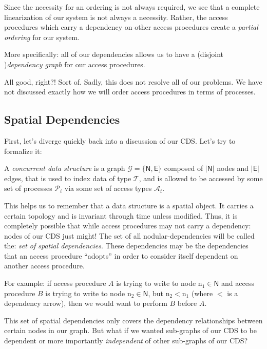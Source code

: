Since the necessity for an ordering is not always required, we see that a complete linearization of our system is not always a necessity. Rather, the access procedures which carry a dependency on other access procedures create a \textit{partial ordering} for our system.

More specifically: all of our dependencies allows us to have a (disjoint )\textit{dependency graph} for our access procedures.

All good, right?! Sort of. Sadly, this does not resolve all of our problems. We have not discussed exactly how we will order access procedures in terms of processes.

\subsection{Spatial Dependencies}

First, let's diverge quickly back into a discussion of our CDS. Let's try to formalize it:

\begin{con-def}
	\label{cds-graph}
	A \textit{concurrent data structure} is a graph $\mathcal{G} = \{\mathsf{N}, \mathsf{E}\}$ composed of $|\mathsf{N}|$ nodes and $|\mathsf{E}|$ edges, that is used to index data of type $\mathcal{T}$, and is allowed to be accessed by some set of processes $\mathcal{P}_{i}$ via some set of access types $\mathcal{A}_{t}$.
\end{con-def}

This helps us to remember that a data structure is a spatial object. It carries a certain topology and is invariant through time unless modified. Thus, it is completely possible that while access procedures may not carry a dependency: nodes of our CDS just might! The set of all nodular-dependencies will be called the: \textit{set of spatial dependencies}. These dependencies may be the dependencies that an access procedure ``adopts'' in order to consider itself dependent on another access procedure.

For example: if access procedure $\mathit{A}$ is trying to write to node $\mathrm{n}_{1} \in \mathsf{N}$ and access procedure $\mathit{B}$ is trying to write to node $\mathrm{n}_{2} \in \mathsf{N}$, but $\mathrm{n}_{2} < \mathrm{n}_{1}$ (where $<$ is a dependency arrow), then we would want to perform $\mathit{B}$ before $\mathit{A}$.

This set of spatial dependencies only covers the dependency relationships between certain nodes in our graph. But what if we wanted sub-graphs of our CDS to be dependent or more importantly \textit{independent} of other sub-graphs of our CDS?

